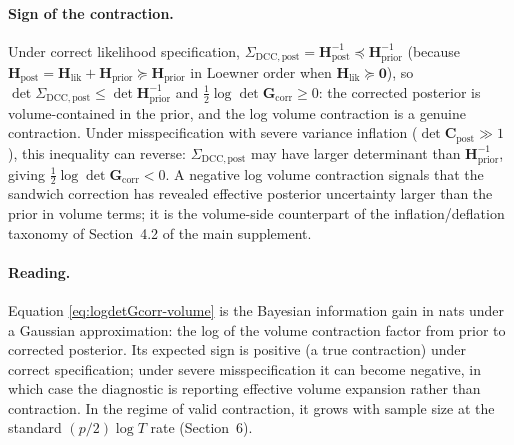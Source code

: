 \documentclass[11pt]{article}
\begin{document}
\paragraph{Sign of the contraction.}
Under correct likelihood specification, $\Sigma_{\mathrm{DCC},\mathrm{post}} = \mathbf H_{\mathrm{post}}^{-1} \preceq \mathbf H_{\mathrm{prior}}^{-1}$ (because $\mathbf H_{\mathrm{post}} = \mathbf H_{\mathrm{lik}} + \mathbf H_{\mathrm{prior}} \succeq \mathbf H_{\mathrm{prior}}$ in Loewner order when $\mathbf H_{\mathrm{lik}} \succeq \mathbf 0$), so $\det \Sigma_{\mathrm{DCC},\mathrm{post}} \leq \det \mathbf H_{\mathrm{prior}}^{-1}$ and $\tfrac{1}{2}\log\det \mathbf G_{\mathrm{corr}} \geq 0$: the corrected posterior is volume-contained in the prior, and the log volume contraction is a genuine contraction. Under misspecification with severe variance inflation ($\det \mathbf C_{\mathrm{post}} \gg 1$), this inequality can reverse: $\Sigma_{\mathrm{DCC},\mathrm{post}}$ may have larger determinant than $\mathbf H_{\mathrm{prior}}^{-1}$, giving $\tfrac{1}{2}\log\det \mathbf G_{\mathrm{corr}} < 0$. A negative log volume contraction signals that the sandwich correction has revealed effective posterior uncertainty larger than the prior in volume terms; it is the volume-side counterpart of the inflation/deflation taxonomy of Section~4.2 of the main supplement.

\paragraph{Reading.}
Equation \eqref{eq:logdetGcorr-volume} is the Bayesian information gain in nats under a Gaussian approximation: the log of the volume contraction factor from prior to corrected posterior. Its expected sign is positive (a true contraction) under correct specification; under severe misspecification it can become negative, in which case the diagnostic is reporting effective volume expansion rather than contraction. In the regime of valid contraction, it grows with sample size at the standard $(p/2) \log T$ rate (Section~6).
\end{document}
